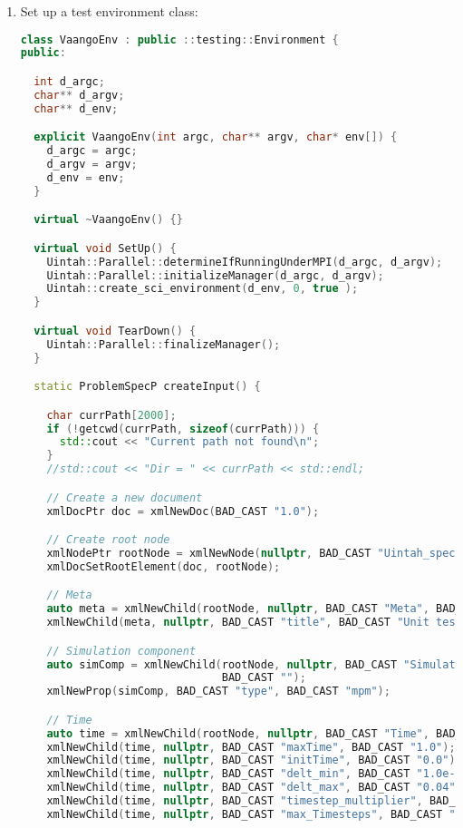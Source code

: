 \begin{enumerate}
  \item Set up a test environment class:
\begin{lstlisting}[language=Cpp]
class VaangoEnv : public ::testing::Environment {
public:

  int d_argc;
  char** d_argv;
  char** d_env;

  explicit VaangoEnv(int argc, char** argv, char* env[]) {
    d_argc = argc;
    d_argv = argv;
    d_env = env;
  }

  virtual ~VaangoEnv() {}

  virtual void SetUp() {
    Uintah::Parallel::determineIfRunningUnderMPI(d_argc, d_argv);
    Uintah::Parallel::initializeManager(d_argc, d_argv);
    Uintah::create_sci_environment(d_env, 0, true );
  }

  virtual void TearDown() {
    Uintah::Parallel::finalizeManager();
  }

  static ProblemSpecP createInput() {

    char currPath[2000];
    if (!getcwd(currPath, sizeof(currPath))) {
      std::cout << "Current path not found\n";
    }
    //std::cout << "Dir = " << currPath << std::endl;

    // Create a new document
    xmlDocPtr doc = xmlNewDoc(BAD_CAST "1.0");

    // Create root node
    xmlNodePtr rootNode = xmlNewNode(nullptr, BAD_CAST "Uintah_specification");
    xmlDocSetRootElement(doc, rootNode);

    // Meta
    auto meta = xmlNewChild(rootNode, nullptr, BAD_CAST "Meta", BAD_CAST "");
    xmlNewChild(meta, nullptr, BAD_CAST "title", BAD_CAST "Unit test Tabular Plasticity");

    // Simulation component 
    auto simComp = xmlNewChild(rootNode, nullptr, BAD_CAST "SimulationComponent",
                               BAD_CAST "");
    xmlNewProp(simComp, BAD_CAST "type", BAD_CAST "mpm");

    // Time
    auto time = xmlNewChild(rootNode, nullptr, BAD_CAST "Time", BAD_CAST "");
    xmlNewChild(time, nullptr, BAD_CAST "maxTime", BAD_CAST "1.0");
    xmlNewChild(time, nullptr, BAD_CAST "initTime", BAD_CAST "0.0");
    xmlNewChild(time, nullptr, BAD_CAST "delt_min", BAD_CAST "1.0e-6");
    xmlNewChild(time, nullptr, BAD_CAST "delt_max", BAD_CAST "0.04");
    xmlNewChild(time, nullptr, BAD_CAST "timestep_multiplier", BAD_CAST "0.3");
    xmlNewChild(time, nullptr, BAD_CAST "max_Timesteps", BAD_CAST "5");


\end{lstlisting}
\end{enumerate}
